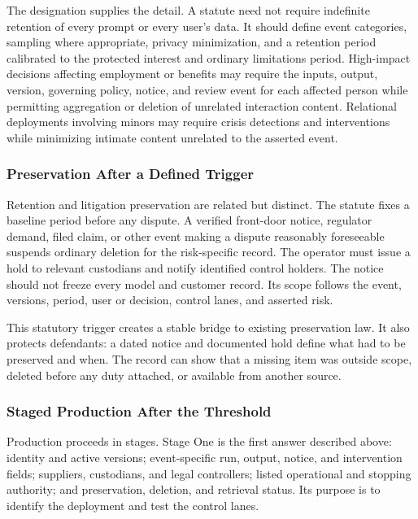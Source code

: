 The designation supplies the detail. A statute need not require indefinite retention of every prompt or every user's data. It should define event categories, sampling where appropriate, privacy minimization, and a retention period calibrated to the protected interest and ordinary limitations period. High-impact decisions affecting employment or benefits may require the inputs, output, version, governing policy, notice, and review event for each affected person while permitting aggregation or deletion of unrelated interaction content. Relational deployments involving minors may require crisis detections and interventions while minimizing intimate content unrelated to the asserted event.

\subsubsection{Preservation After a Defined Trigger}

Retention and litigation preservation are related but distinct. The statute fixes a baseline period before any dispute. A verified front-door notice, regulator demand, filed claim, or other event making a dispute reasonably foreseeable suspends ordinary deletion for the risk-specific record. The operator must issue a hold to relevant custodians and notify identified control holders. The notice should not freeze every model and customer record. Its scope follows the event, versions, period, user or decision, control lanes, and asserted risk.

This statutory trigger creates a stable bridge to existing preservation law. It also protects defendants: a dated notice and documented hold define what had to be preserved and when. The record can show that a missing item was outside scope, deleted before any duty attached, or available from another source.

\subsubsection{Staged Production After the Threshold}

Production proceeds in stages. Stage One is the first answer described above: identity and active versions; event-specific run, output, notice, and intervention fields; suppliers, custodians, and legal controllers; listed operational and stopping authority; and preservation, deletion, and retrieval status. Its purpose is to identify the deployment and test the control lanes.

